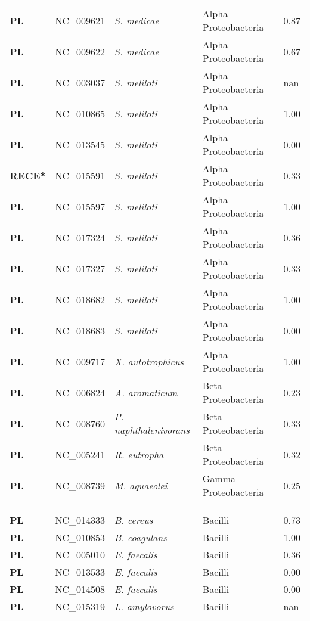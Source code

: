 \begin{adjustwidth}{-3cm}{2cm}
{\begin{supertabular}{>{\bfseries}l|p{0.1\textwidth}p{0.14\textwidth}l|l}
PL & NC\_009621 & \textit{S. medicae} & Alpha-Proteobacteria & 0.87\\
PL & NC\_009622 & \textit{S. medicae} & Alpha-Proteobacteria & 0.67\\
PL & NC\_003037 & \textit{S. meliloti} & Alpha-Proteobacteria & nan\\
PL & NC\_010865 & \textit{S. meliloti} & Alpha-Proteobacteria & 1.00\\
PL & NC\_013545 & \textit{S. meliloti} & Alpha-Proteobacteria & 0.00\\
RECE* & NC\_015591 & \textit{S. meliloti} & Alpha-Proteobacteria & 0.33\\
PL & NC\_015597 & \textit{S. meliloti} & Alpha-Proteobacteria & 1.00\\
PL & NC\_017324 & \textit{S. meliloti} & Alpha-Proteobacteria & 0.36\\
PL & NC\_017327 & \textit{S. meliloti} & Alpha-Proteobacteria & 0.33\\
PL & NC\_018682 & \textit{S. meliloti} & Alpha-Proteobacteria & 1.00\\
PL & NC\_018683 & \textit{S. meliloti} & Alpha-Proteobacteria & 0.00\\
PL & NC\_009717 & \textit{X. autotrophicus} & Alpha-Proteobacteria & 1.00\\
PL & NC\_006824 & \textit{A. aromaticum} & Beta-Proteobacteria & 0.23\\
PL & NC\_008760 & \textit{P. naphthalenivorans} & Beta-Proteobacteria & 0.33\\
PL & NC\_005241 & \textit{R. eutropha} & Beta-Proteobacteria & 0.32\\
PL & NC\_008739 & \textit{M. aquaeolei} & Gamma-Proteobacteria & 0.25\\
\\
\\
\hline\\
PL & NC\_014333 & \textit{B. cereus} & Bacilli & 0.73\\
PL & NC\_010853 & \textit{B. coagulans} & Bacilli & 1.00\\
PL & NC\_005010 & \textit{E. faecalis} & Bacilli & 0.36\\
PL & NC\_013533 & \textit{E. faecalis} & Bacilli & 0.00\\
PL & NC\_014508 & \textit{E. faecalis} & Bacilli & 0.00\\
PL & NC\_015319 & \textit{L. amylovorus} & Bacilli & nan\\

\end{supertabular}}
\end{adjustwidth}
